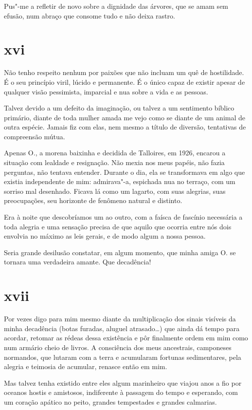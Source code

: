 Pus"-me a refletir de novo sobre a dignidade das árvores, que se amam sem
efusão, num abraço que consome tudo e não deixa rastro.

\section{xvi}

Não tenho respeito nenhum por paixões que não incluam um quê de
hostilidade. É o seu princípio viril, lúcido e permanente. É o único
capaz de existir apesar de qualquer visão pessimista, imparcial e nua
sobre a vida e as pessoas.

Talvez devido a um defeito da imaginação, ou talvez a um
sentimento bíblico primário, diante de toda mulher amada me vejo como
se diante de um animal de outra espécie. Jamais fiz com elas, nem mesmo
a título de diversão, tentativas de compreensão mútua.

Apenas O., a morena baixinha e decidida de Talloires, em 1926, encarou a
situação com lealdade e resignação. Não mexia nos meus papéis, não fazia
perguntas, não tentava entender. Durante o dia, ela se transformava em
algo que existia independente de mim: admirava"-a, espichada nua no
terraço, com um sorriso mal desenhado. Ficava lá como um lagarto, com
suas alegrias, suas preocupações, seu horizonte de fenômeno natural e
distinto.

Era à noite que descobríamos um ao outro, com a faísca de fascínio
necessária a toda alegria e uma sensação precisa de que aquilo que
ocorria entre nós dois envolvia no máximo as leis gerais, e de modo
algum a nossa pessoa.

Seria grande desilusão constatar, em algum momento, que minha amiga
O. se tornara uma verdadeira amante. Que decadência!

\section{xvii}

Por vezes digo para mim mesmo diante da multiplicação dos
sinais visíveis da minha decadência (botas furadas, aluguel
atrasado\ldots{}) que ainda dá tempo para acordar, retomar as rédeas
dessa existência e pôr finalmente ordem em mim como num armário cheio de
livros. A consciência dos meus ancestrais, camponeses normandos, que
lutaram com a terra e acumularam fortunas sedimentares, pela alegria e
teimosia de acumular, renasce então em mim.

Mas talvez tenha existido entre eles algum marinheiro que viajou anos a
fio por oceanos hostis e amistosos, indiferente à passagem do tempo e
esperando, com um coração apático no peito, grandes tempestades e
grandes calmarias.


